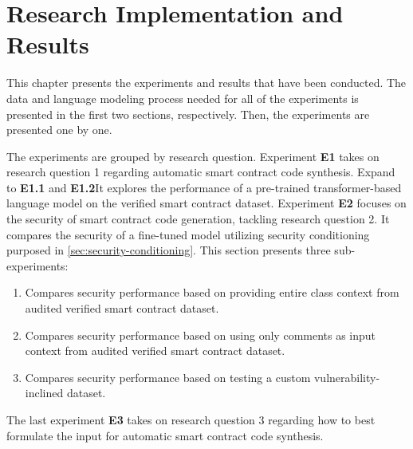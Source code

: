
\chapter{Research Implementation and Results}
\label{chap:implementation-and-results}
This chapter presents the experiments and results that have been conducted. The data and language modeling process needed for all of the experiments is presented in the first two sections, respectively. Then, the experiments are presented one by one. 

The experiments are grouped by research question. Experiment \textbf{E1} takes on research question 1 regarding automatic smart contract code synthesis. Expand to \textbf{E1.1} and \textbf{E1.2}It explores the performance of a pre-trained transformer-based language model on the verified smart contract dataset. Experiment \textbf{E2} focuses on the security of smart contract code generation, tackling research question 2. It compares the security of a fine-tuned model utilizing security conditioning purposed in \cref{sec:security-conditioning}. This section presents three sub-experiments:
\begin{enumerate}[label=\textbf{E2.\arabic*.}, leftmargin=1.5cm]
    \item Compares security performance based on providing entire class context from audited verified smart contract dataset.
    \item Compares security performance based on using only comments as input context from audited verified smart contract dataset.
    \item Compares security performance based on testing a custom vulnerability-inclined dataset.
\end{enumerate}
The last experiment \textbf{E3} takes on research question 3 regarding how to best formulate the input for automatic smart contract code synthesis.

